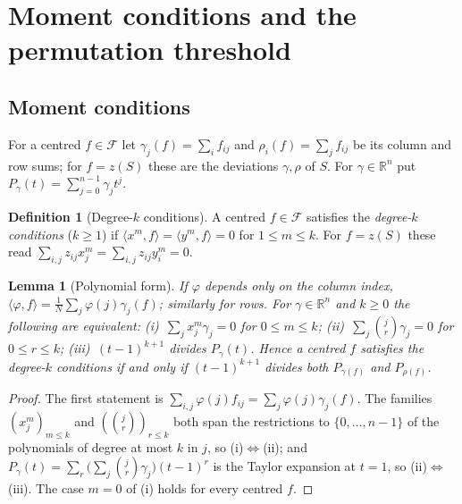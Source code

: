 \documentclass[11pt,a4paper]{article}
\theoremstyle{plain}
\newtheorem{lemma}[theorem]{Lemma}
\theoremstyle{definition}
\newtheorem{definition}[theorem]{Definition}
\theoremstyle{remark}
\newcommand{\R}{\mathbb{R}}
\begin{document}
\section{Moment conditions and the permutation threshold}
\label{sec:theory}

\subsection{Moment conditions}
\label{sec:theory_hierarchy}

For a centred $f\in\mathcal F$ let $\gamma_j(f)=\sum_if_{ij}$ and $\rho_i(f)=\sum_jf_{ij}$ be its column and row sums; for $f=z(S)$ these are the deviations $\gamma,\rho$ of $S$.
For $\gamma\in\R^n$ put $P_\gamma(t)=\sum_{j=0}^{n-1}\gamma_jt^j$.

\begin{definition}[Degree-$k$ conditions]
\label{def:degree_k}
A centred $f\in\mathcal F$ satisfies the \emph{degree-$k$ conditions} ($k\ge1$) if $\langle x^{m},f\rangle=\langle y^{m},f\rangle=0$ for $1\le m\le k$.
For $f=z(S)$ these read $\sum_{i,j}z_{ij}x_j^m=\sum_{i,j}z_{ij}y_i^m=0$.
\end{definition}

\begin{lemma}[Polynomial form]
\label{lem:poly_form}
If $\varphi$ depends only on the column index, $\langle\varphi,f\rangle=\frac1N\sum_j\varphi(j)\gamma_j(f)$; similarly for rows.
For $\gamma\in\R^{n}$ and $k\ge0$ the following are equivalent:
(i)~$\sum_jx_j^{m}\gamma_j=0$ for $0\le m\le k$;
(ii)~$\sum_j\binom{j}{r}\gamma_j=0$ for $0\le r\le k$;
(iii)~$(t-1)^{k+1}$ divides $P_\gamma(t)$.
Hence a centred $f$ satisfies the degree-$k$ conditions if and only if $(t-1)^{k+1}$ divides both $P_{\gamma(f)}$ and $P_{\rho(f)}$.
\end{lemma}

\begin{proof}
The first statement is $\sum_{i,j}\varphi(j)f_{ij}=\sum_j\varphi(j)\gamma_j(f)$.
The families $(x_j^{m})_{m\le k}$ and $(\binom{j}{r})_{r\le k}$ both span the restrictions to $\{0,\dots,n-1\}$ of the polynomials of degree at most $k$ in $j$, so (i)$\Leftrightarrow$(ii); and $P_\gamma(t)=\sum_{r}\bigl(\sum_j\binom jr\gamma_j\bigr)(t-1)^{r}$ is the Taylor expansion at $t=1$, so (ii)$\Leftrightarrow$(iii).
The case $m=0$ of (i) holds for every centred $f$.
\end{proof}
\end{document}
